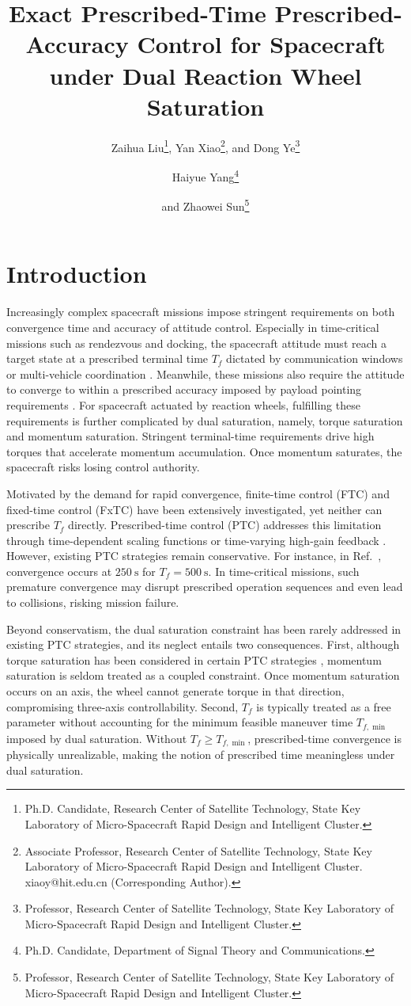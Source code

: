 \documentclass[journal]{new-aiaa}
\title{Exact Prescribed-Time Prescribed-Accuracy Control for Spacecraft under Dual Reaction Wheel Saturation}
\author{Zaihua Liu\footnote{Ph.D. Candidate, Research Center of Satellite Technology, State Key Laboratory of Micro-Spacecraft Rapid Design and Intelligent Cluster.}, Yan Xiao\footnote{Associate Professor, Research Center of Satellite Technology, State Key Laboratory of Micro-Spacecraft Rapid Design and Intelligent Cluster. xiaoy@hit.edu.cn (Corresponding Author).}, and Dong Ye\footnote{Professor, Research Center of Satellite Technology, State Key Laboratory of Micro-Spacecraft Rapid Design and Intelligent Cluster.}}
\affil{Harbin Institute of Technology, Harbin 150001, People's Republic of China}
\author{Haiyue Yang\footnote{Ph.D. Candidate, Department of Signal Theory and Communications.}}
\affil{Universitat Polit\`{e}cnica de Catalunya, Barcelona 08034, Spain}
\author{and Zhaowei Sun\footnote{Professor, Research Center of Satellite Technology, State Key Laboratory of Micro-Spacecraft Rapid Design and Intelligent Cluster.}}
\affil{Harbin Institute of Technology, Harbin 150001, People's Republic of China}
\begin{document}
\maketitle

\section{Introduction}

Increasingly complex spacecraft missions impose stringent requirements on
both convergence time and accuracy of attitude control.
Especially in time-critical missions such as rendezvous and docking,
the spacecraft attitude must reach a target state at a prescribed
terminal time $T_f$ dictated by communication windows or multi-vehicle coordination
\cite{alex_pothen_pose_2022, das_predefined-time_2024, xu_distributed_2024}.
Meanwhile, these missions also require the attitude to converge to within a prescribed
accuracy imposed by payload pointing requirements
\cite{xiao_attitude_2020,ye_predefined-time_2022,xiao_quantitative_2025}.
For spacecraft actuated by reaction wheels, fulfilling these requirements is further
complicated by dual saturation, namely, torque saturation and
momentum saturation.
Stringent terminal-time requirements drive high torques that accelerate
momentum accumulation.
Once momentum saturates, the spacecraft risks losing control authority.

Motivated by the demand for rapid convergence, finite-time control (FTC) and
fixed-time control (FxTC)
\cite{hong_finite-time_2006,hu_finite-time_2017,
polyakov_nonlinear_2012,polyakov_finite-time_2015}
have been extensively investigated, yet neither can prescribe $T_f$ directly.
Prescribed-time control (PTC)
\cite{sanchez-torres_predefined-time_2015,song_time-varying_2017}
addresses this limitation through time-dependent scaling functions
\cite{sanchez-torres_class_2018,xiao_predefined-time_2025}
or time-varying high-gain feedback
\cite{zhou_finite-time_2020,cao_practical_2022,xiao_scaling_2025}.
However, existing PTC strategies remain conservative.
For instance, in Ref.~\cite{xu_distributed_2024}, convergence occurs at
$250~\mathrm{s}$ for $T_f=500~\mathrm{s}$.
In time-critical missions, such premature convergence may disrupt prescribed operation sequences and even lead to collisions, risking mission failure.

Beyond conservatism, the dual saturation constraint has been rarely addressed
in existing PTC strategies, and its neglect entails two consequences.
First, although torque saturation has been considered in certain PTC strategies
\cite{sun_attitude_2024,xu_distributed_2022,zhao_exponential_2024},
momentum saturation is seldom treated as a coupled constraint.
Once momentum saturation occurs on an axis, the wheel cannot generate torque
in that direction, compromising three-axis controllability.
Second, $T_f$ is typically treated as a free parameter
without accounting for the minimum feasible maneuver time $T_{f,\min}$
imposed by dual saturation.
Without $T_f \ge T_{f,\min}$,
prescribed-time convergence is physically unrealizable,
making the notion of prescribed time meaningless under dual saturation.
\end{document}
